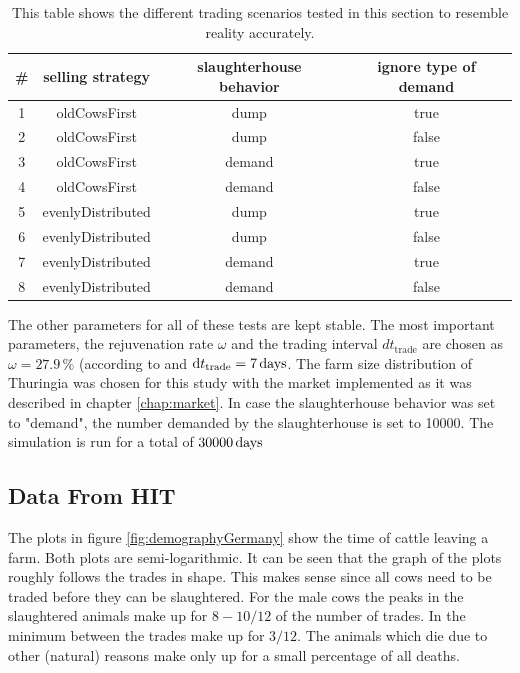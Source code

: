 \begin{table}[htb]
    \begin{center}
    \begin{tabular}{|cccc|}\hline
        \rowcolor{dunkelgrau} \#  & selling strategy & slaughterhouse behavior & ignore type of demand \\\hline
                              1  & oldCowsFirst& dump& true\\\hline
\rowcolor{hellgrau}           2  & oldCowsFirst& dump&  false\\\hline
                              3  & oldCowsFirst& demand& true\\\hline
\rowcolor{hellgrau}           4  & oldCowsFirst& demand& false\\\hline
                              5  & evenlyDistributed&dump& true\\\hline
\rowcolor{hellgrau}           6  & evenlyDistributed& dump& false\\\hline 
                              7 & evenlyDistributed& demand& true\\ \hline
\rowcolor{hellgrau}           8 & evenlyDistributed & demand&  false \\\hline           
\end{tabular}
\caption[Tested Trading Configurations]{This table shows the different trading scenarios tested in this section to resemble reality accurately.}
\label{tab:tradingConfig} 
\end{center}
\end{table}
The other parameters for all of these tests are kept stable. The most important parameters, the rejuvenation rate $\omega$ and the trading interval $dt_\text{trade}$ are chosen as $\omega =27.9\,\%$ (according to \citep{personalCom} and $\text{d}t_\text{trade} = 7\,\text{days}$. The farm size distribution of Thuringia was chosen for this study with the market implemented as it was described in chapter \ref{chap:market}. In case the slaughterhouse behavior was set to "demand", the number demanded by the slaughterhouse is set to 10000. The simulation is run for a total of $30000\,\text{days}$

\subsection{Data From HIT}
The plots in figure \ref{fig:demographyGermany} show the time of cattle leaving a farm. Both plots are semi-logarithmic. It can be seen that the graph of the plots roughly follows the trades in shape. This makes sense since all cows need to be traded before they can be slaughtered. For the male cows the peaks in the slaughtered animals make up for $8-10/12$ of the number of trades. In the minimum between the trades make up for $3/12$. The animals which die due to other (natural) reasons make only up for a small percentage of all deaths.


